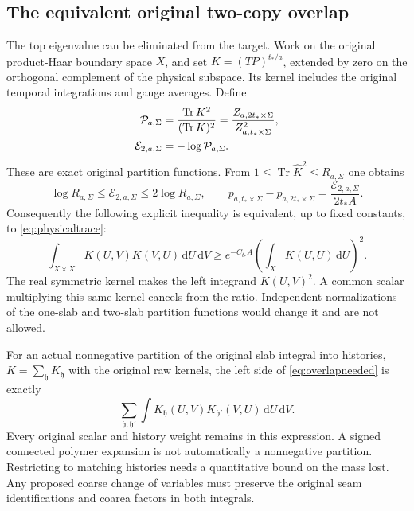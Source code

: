 \documentclass[11pt,letterpaper]{article}
\theoremstyle{plain}
\theoremstyle{remark}\newtheorem{remark}[theorem]{Scope}
\DeclareMathOperator{\Tr}{Tr}\DeclareMathOperator{\Vol}{Vol}
\newcommand{\dd}{\,\mathrm d}\newcommand{\OH}{\mathcal O_H}
\begin{document}
\subsection{The equivalent original two-copy overlap}

The top eigenvalue can be eliminated from the target. Work on the original
product-Haar boundary space $X$, and set
$K=(TP)^{t_*/a}$, extended by zero on the orthogonal complement of the
physical subspace. Its kernel includes the original temporal integrations and
gauge averages. Define
\begin{align}
\mathcal P_{a,\Sigma}
&=\frac{\Tr K^2}{(\Tr K)^2}
=\frac{Z_{a,2t_*\times\Sigma}}{Z_{a,t_*\times\Sigma}^2},
\notag\\
\mathcal E_{2,a,\Sigma}&=-\log\mathcal P_{a,\Sigma}.
\label{eq:purity}
\end{align}
These are exact original partition functions. From
$1\le\Tr\widehat K^2\le R_{a,\Sigma}$ one obtains
\begin{equation}
\log R_{a,\Sigma}\le\mathcal E_{2,a,\Sigma}
\le2\log R_{a,\Sigma},\qquad
p_{a,t_*\times\Sigma}-p_{a,2t_*\times\Sigma}
=\frac{\mathcal E_{2,a,\Sigma}}{2t_*A}.
\label{eq:purityequivalence}
\end{equation}
Consequently the following explicit inequality is equivalent, up to fixed
constants, to \eqref{eq:physicaltrace}:
\begin{equation}
\boxed{
\int_{X\times X}K(U,V)K(V,U)\dd U\dd V
\ge e^{-C_{t_*}A}
\left(\int_XK(U,U)\dd U\right)^2.}
\label{eq:overlapneeded}
\end{equation}
The real symmetric kernel makes the left integrand $K(U,V)^2$.
A common scalar multiplying this same kernel cancels from the ratio.
Independent normalizations of the one-slab and two-slab partition functions
would change it and are not allowed.

For an actual nonnegative partition of the original slab integral into
histories, $K=\sum_{\mathfrak h}K_{\mathfrak h}$ with the original raw kernels,
the left side of \eqref{eq:overlapneeded} is exactly
\begin{equation}
\sum_{\mathfrak h,\mathfrak h'}
\int K_{\mathfrak h}(U,V)K_{\mathfrak h'}(V,U)\dd U\dd V.
\label{eq:historyoverlap}
\end{equation}
Every original scalar and history weight remains in this expression. A signed
connected polymer expansion is not automatically a nonnegative partition.
Restricting to matching histories needs a quantitative bound on the mass lost.
Any proposed coarse change of variables must preserve the original seam
identifications and coarea factors in both integrals.
\end{document}

